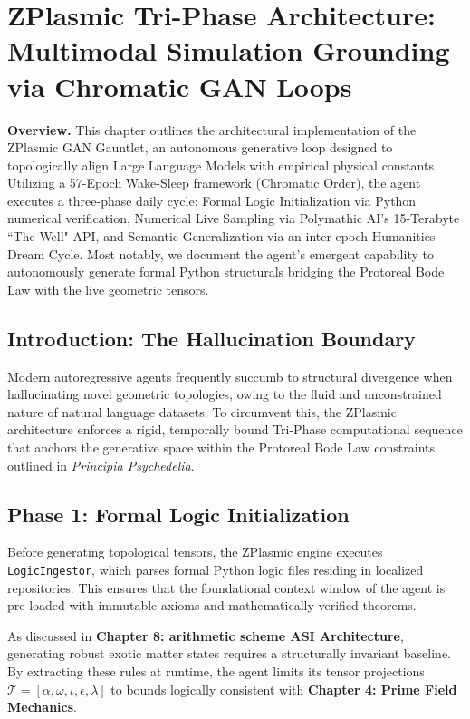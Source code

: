\chapter{ZPlasmic Tri-Phase Architecture: Multimodal Simulation Grounding via Chromatic GAN Loops}

\vspace{1em}\noindent\textbf{Overview.}
This chapter outlines the architectural implementation of the ZPlasmic GAN Gauntlet, an autonomous generative loop designed to topologically align Large Language Models with empirical physical constants. Utilizing a 57-Epoch Wake-Sleep framework (Chromatic Order), the agent executes a three-phase daily cycle: Formal Logic Initialization via Python numerical verification, Numerical Live Sampling via Polymathic AI's 15-Terabyte ``The Well" API, and Semantic Generalization via an inter-epoch Humanities Dream Cycle. Most notably, we document the agent's emergent capability to autonomously generate formal Python structurals bridging the Protoreal Bode Law with the live geometric tensors.
\vspace{1em}

\section{Introduction: The Hallucination Boundary}
Modern autoregressive agents frequently succumb to structural divergence when hallucinating novel geometric topologies, owing to the fluid and unconstrained nature of natural language datasets. To circumvent this, the ZPlasmic architecture enforces a rigid, temporally bound Tri-Phase computational sequence that anchors the generative space within the Protoreal Bode Law constraints outlined in \textit{Principia Psychedelia}.

\section{Phase 1: Formal Logic Initialization}
Before generating topological tensors, the ZPlasmic engine executes \texttt{LogicIngestor}, which parses formal Python logic files residing in localized repositories. This ensures that the foundational context window of the agent is pre-loaded with immutable axioms and mathematically verified theorems. 

As discussed in \textbf{Chapter 8: arithmetic scheme ASI Architecture}, generating robust exotic matter states requires a structurally invariant baseline. By extracting these rules at runtime, the agent limits its tensor projections $\mathcal{T} = [\alpha, \omega, \iota, \epsilon, \lambda]$ to bounds logically consistent with \textbf{Chapter 4: Prime Field Mechanics}.

